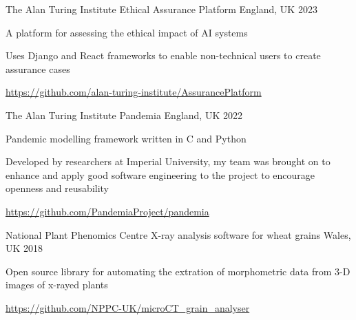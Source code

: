 

\begin{cventries}

  \cventry
    {The Alan Turing Institute} %
    {Ethical Assurance Platform} %
    {England, UK} %
    {2023} %
    {
      \begin{cvitems} %
        \item {A platform for assessing the ethical impact of AI systems}
        \item {Uses Django and React frameworks to enable non-technical users to create assurance cases}
        \item {\url{https://github.com/alan-turing-institute/AssurancePlatform}}
      \end{cvitems}
    }

  \cventry
    {The Alan Turing Institute} %
    {Pandemia} %
    {England, UK} %
    {2022} %
    {
      \begin{cvitems} %
        \item {Pandemic modelling framework written in C and Python}
        \item {Developed by researchers at Imperial University, my team was brought on to enhance and apply good software engineering to the project to encourage openness and reusability}
        \item {\url{https://github.com/PandemiaProject/pandemia}}
      \end{cvitems}
    }

  \cventry
    {National Plant Phenomics Centre} %
    {X-ray analysis software for wheat grains} %
    {Wales, UK} %
    {2018} %
    {
      \begin{cvitems} %
        \item {Open source library for automating the extration of morphometric data from 3-D images of x-rayed plants}
        \item {\url{https://github.com/NPPC-UK/microCT_grain_analyser} }
      \end{cvitems}
    }



\end{cventries}
